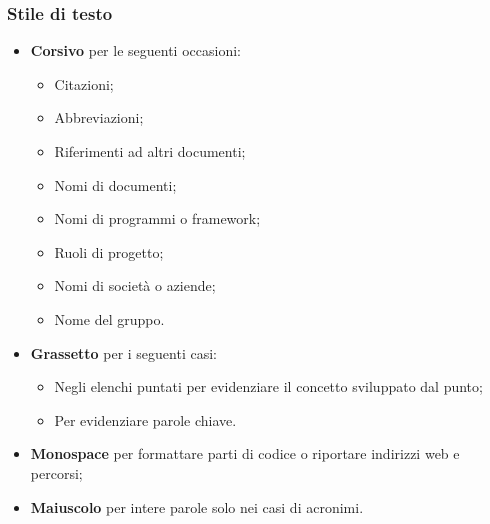 \subsubsection{Stile di testo}
\begin{itemize}
\item \textbf{Corsivo}  per le seguenti occasioni:
  \begin{itemize}
  \item Citazioni;
  \item Abbreviazioni;
  \item Riferimenti ad altri documenti;
  \item Nomi di documenti;
  \item Nomi di programmi o framework;
  \item Ruoli di progetto;
  \item Nomi di societ\`a o aziende;
  \item Nome del gruppo.
  \end{itemize}
\item \textbf{Grassetto} per i seguenti casi:
  \begin{itemize}
  \item Negli elenchi puntati per evidenziare il concetto sviluppato dal punto;
  \item Per evidenziare parole chiave.
  \end{itemize}
\item \textbf{Monospace} per formattare parti di codice o riportare indirizzi web e percorsi;
\item \textbf{Maiuscolo} per intere parole solo nei casi di acronimi.
\end{itemize}

